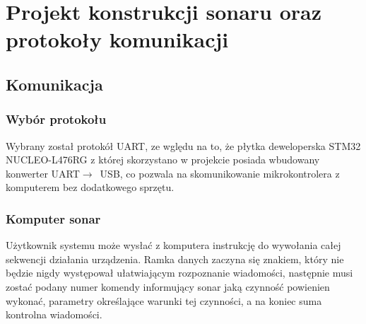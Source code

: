 \chapter[Projekt konstrukcji sonaru oraz protokoły komunikacji]{Projekt konstrukcji sonaru oraz protokoły komunikacji}

\label{chapter:konstrukcja}


\section{Komunikacja}

\subsection{Wybór protokołu}

Wybrany został protokół UART, ze wględu na to, że płytka deweloperska STM32 NUCLEO-L476RG 
z której skorzystano w projekcie posiada wbudowany konwerter UART$\rightarrow$~USB, 
co pozwala na skomunikowanie mikrokontrolera z komputerem bez dodatkowego sprzętu.

\subsection{Komputer \textrightarrow{} sonar}
Użytkownik systemu może wysłać z komputera instrukcję do wywołania całej sekwencji działania urządzenia. 
Ramka danych zaczyna się znakiem, który nie będzie nigdy występował  ułatwiającym rozpoznanie wiadomości, 
następnie musi zostać podany numer komendy informujący sonar jaką czynność powienien wykonać, 
parametry określające warunki tej czynności, a na koniec suma kontrolna wiadomości.

